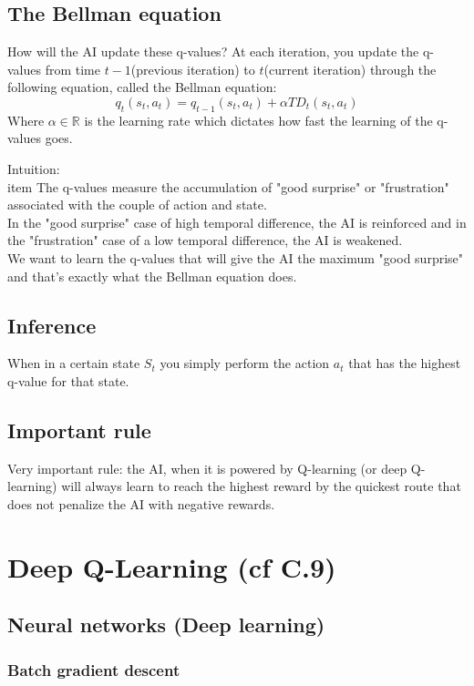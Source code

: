 \documentclass[french]{article}
\begin{document}
\subsection{The Bellman equation}
How will the AI update these q-values? At each iteration, you update the q-values from time $t-1$(previous iteration) to $t$(current iteration) through the following equation, called the Bellman equation:
\[q_t(s_t,a_t) = q_{t-1}(s_t,a_t) + \alpha TD_t(s_t,a_t)\]
Where $\alpha \in \mathbb{R}$ is the learning rate which dictates how fast the learning of the q-values goes.

Intuition:\\
item The q-values measure the accumulation of "good surprise" or "frustration" associated with the couple of action and state.\\
In the "good surprise" case of high temporal difference, the AI is reinforced and in the "frustration" case of a low temporal difference, the AI is weakened.\\
We want to learn the q-values that will give the AI the maximum "good surprise" and that's exactly what the Bellman equation does.

\subsection{Inference}

When in a certain state $S_t$ you simply perform the action $a_t$ that has the highest q-value for that state.


\subsection{Important rule}
Very important rule: the AI, when it is powered by Q-learning (or deep Q-learning) will always learn to reach the highest reward by the quickest route that does not penalize the AI with negative rewards.

\section{Deep Q-Learning (cf C.9)}

\subsection{Neural networks (Deep learning)}

\subsubsection{Batch gradient descent}
\end{document}
